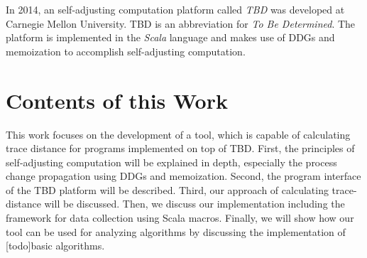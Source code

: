 In 2014, an self-adjusting computation platform called \textit{TBD} was developed at Carnegie Mellon University. TBD is an abbreviation for \textit{To Be Determined}. The platform is implemented in the \textit{Scala} language and makes use of DDGs and memoization to accomplish self-adjusting computation. 

\section{Contents of this Work}

This work focuses on the development of a tool, which is capable of calculating trace distance for programs implemented on top of TBD. First, the principles of self-adjusting computation will be explained in depth, especially the process change propagation using DDGs and memoization. Second, the program interface of the TBD platform will be described. Third, our approach of calculating trace-distance will be discussed. Then, we discuss our implementation including the framework for data collection using Scala macros. 
Finally, we will show how our tool can be used for analyzing algorithms by discussing the implementation of [todo]basic algorithms. 